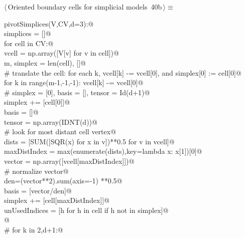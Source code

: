 \documentclass[11pt,oneside]{article}    %
\begin{document}
\begin{flushleft} \small \label{scrap67}
\protect{}$\langle\,$Oriented boundary cells for simplicial models\nobreak\ {\footnotesize 40b}$\,\rangle\equiv$
\vspace{-1ex}
\begin{list}{}{} \item
\mbox{}\verb@def pivotSimplices(V,CV,d=3):@\\
\mbox{}\verb@    simplices = []@\\
\mbox{}\verb@    for cell in CV:@\\
\mbox{}\verb@        vcell = np.array([V[v] for v in cell])@\\
\mbox{}\verb@        m, simplex = len(cell), []@\\
\mbox{}\verb@        # translate the cell: for each k, vcell[k] -= vcell[0], and simplex[0] := cell[0]@\\
\mbox{}\verb@        for k in range(m-1,-1,-1): vcell[k] -= vcell[0]@\\
\mbox{}\verb@        # simplex = [0], basis = [], tensor = Id(d+1)@\\
\mbox{}\verb@        simplex += [cell[0]]@\\
\mbox{}\verb@        basis = []@\\
\mbox{}\verb@        tensor = np.array(IDNT(d))@\\
\mbox{}\verb@        # look for most distant cell vertex@\\
\mbox{}\verb@        dists = [SUM([SQR(x) for x in v])**0.5 for v in vcell]@\\
\mbox{}\verb@        maxDistIndex = max(enumerate(dists),key=lambda x: x[1])[0]@\\
\mbox{}\verb@        vector = np.array([vcell[maxDistIndex]])@\\
\mbox{}\verb@        # normalize vector@\\
\mbox{}\verb@        den=(vector**2).sum(axis=-1) **0.5@\\
\mbox{}\verb@        basis = [vector/den]@\\
\mbox{}\verb@        simplex += [cell[maxDistIndex]]@\\
\mbox{}\verb@        unUsedIndices = [h for h in cell if h not in simplex]@\\
\mbox{}\verb@        @\\
\mbox{}\verb@        # for k in {2,d+1}:@\\

\end{list}
\end{flushleft}
\end{document}
